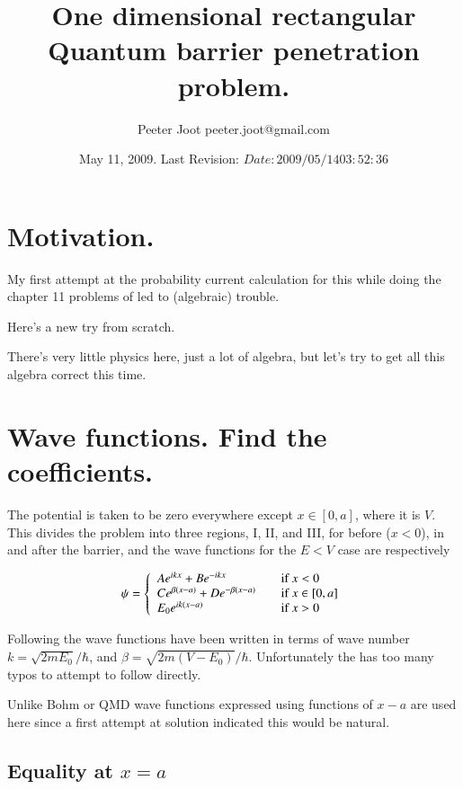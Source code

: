 \documentclass{article}
\title{ One dimensional rectangular Quantum barrier penetration problem. }
\author{Peeter Joot \quad peeter.joot@gmail.com }
\date{ May 11, 2009.  Last Revision: $Date: 2009/05/14 03:52:36 $ }
\begin{document}
\maketitle{}
\tableofcontents
\section{ Motivation. }

My first attempt at the probability current calculation for this
while doing the chapter 11 problems of \cite{bohm1989qt} led to (algebraic) trouble.

Here's a new try from scratch.

There's very little physics here, just a lot of algebra, but let's try
to get all this algebra correct this time.

\section{ Wave functions.  Find the coefficients. }

The potential is taken to be zero everywhere except $x \in [0,a]$, where it is
$V$.  This divides the problem into three regions, I, II, and III, for 
before ($x<0$), in and after the barrier, and the wave functions for the 
$E <V$ case are respectively

\begin{equation}
\psi =
\left\{
\begin{array}{l l}
A e^{i k x} + B e^{-i k x} & \quad \mbox{if $x <0$} \\
C e^{ \beta(x-a)} + D e^{ -\beta(x-a)} & \quad \mbox{if $x \in [0,a]$} \\
E_0 e^{i k(x-a)} & \quad \mbox{if $x >0$} \\
\end{array}
\right.
\end{equation}

Following \cite{mcmahon2005qmd} the wave functions have been written in terms of wave number 
$k = \sqrt{2 m E_0}/\hbar$, and $\beta = \sqrt{2 m (V-E_0)}/\hbar$.  Unfortunately the 
\cite{mcmahon2005qmd} has too many typos to attempt to follow directly.

Unlike Bohm or QMD wave functions expressed using functions of $x-a$ are used here since a first
attempt at solution indicated this would be natural.

\subsection{ Equality at $x=a$ }
\end{document}
